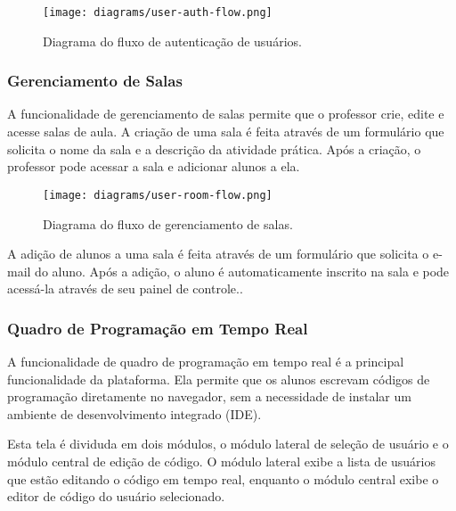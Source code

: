\begin{figure}[H]
    \centering
    \texttt{[image: diagrams/user-auth-flow.png]}
    \caption{Diagrama do fluxo de autenticação de usuários.}
    \label{fig:user-auth-flow}
\end{figure}


\subsubsection{Gerenciamento de Salas}

A funcionalidade de gerenciamento de salas permite que o professor crie, edite e acesse salas de aula. A criação de uma sala é feita através de um formulário que solicita o nome da sala e a descrição da atividade prática. Após a criação, o professor pode acessar a sala e adicionar alunos a ela.


\begin{figure}[H]
    \centering
    \texttt{[image: diagrams/user-room-flow.png]}
    \caption{Diagrama do fluxo de gerenciamento de salas.}
    \label{fig:user-room-flow}
\end{figure}

A adição de alunos a uma sala é feita através de um formulário que solicita o e-mail do aluno. Após a adição, o aluno é automaticamente inscrito na sala e pode acessá-la através de seu painel de controle..

\subsubsection{Quadro de Programação em Tempo Real}

A funcionalidade de quadro de programação em tempo real é a principal funcionalidade da plataforma. Ela permite que os alunos escrevam códigos de programação diretamente no navegador, sem a necessidade de instalar um ambiente de desenvolvimento integrado (IDE).

Esta tela é dividuda em dois módulos, o módulo lateral de seleção de usuário e o módulo central de edição de código. O módulo lateral exibe a lista de usuários que estão editando o código em tempo real, enquanto o módulo central exibe o editor de código do usuário selecionado.